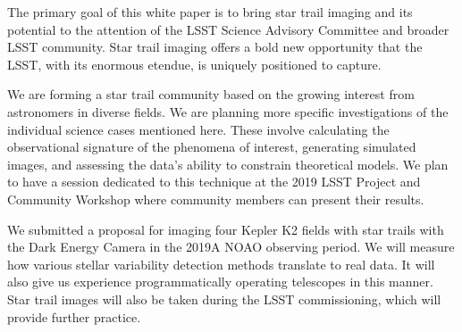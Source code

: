 \documentclass[12pt, letterpaper]{article}
\begin{document}
The primary goal of this white paper is to bring star trail imaging and its potential to the attention of the LSST Science Advisory Committee and broader LSST community. Star trail imaging offers a bold new opportunity that the LSST, with its enormous etendue, is uniquely positioned to capture. 

We are forming a star trail community based on the growing interest from astronomers in diverse fields. We are planning more specific investigations of the individual science cases mentioned here. These involve calculating the observational signature of the phenomena of interest, generating simulated images, and assessing the data's ability to constrain theoretical models. We plan to have a session dedicated to this technique at the 2019 LSST Project and Community Workshop where community members can present their results.

We submitted a proposal for imaging four Kepler K2 fields with star trails with the Dark Energy Camera in the 2019A NOAO observing period. We will measure how various stellar variability detection methods translate to real data. It will also give us experience programmatically operating telescopes in this manner. Star trail images will also be taken during the LSST commissioning, which will provide further practice. 



\end{document}
